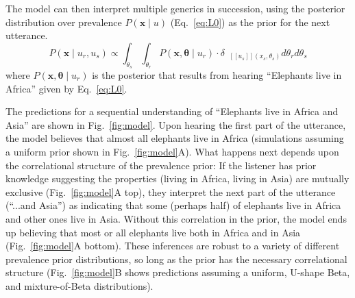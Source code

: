\documentclass[10pt,letterpaper]{article}
\newcommand{\denote}[1]{\mbox{ $[\![ #1 ]\!]$}}
\begin{document}
The model can then interpret multiple generics in succession, using the posterior distribution over prevalence $P(\textbf{x} \mid u)$ (Eq.~\ref{eq:L0}) as the prior for the next utterance. 
\begin{equation}
P(\textbf{x} \mid u_{r}, u_{s}) \propto  \int_{\theta_s} \int_{\theta_r}P(\textbf{x}, \boldsymbol{\theta} \mid u_{r})  \cdot \delta_{\denote{u_{s}}(x_{s}, \theta_{s})} d\theta_r d\theta_s%
\label{eq:L0a}
\end{equation}
\noindent where $P(\textbf{x}, \boldsymbol{\theta} \mid u_{r})$  is the posterior that results from hearing ``Elephants live in Africa'' given by Eq.~\ref{eq:L0}.

The predictions for a sequential understanding of ``Elephants live in Africa and Asia'' are shown in Fig.~\ref{fig:model}.
Upon hearing the first part of the utterance, the model believes that almost all elephants live in Africa (simulations assuming a uniform prior shown in Fig.~\ref{fig:model}A). 
What happens next depends upon the correlational structure of the prevalence prior: If the listener has prior knowledge suggesting the properties (living in Africa, living in Asia) are mutually exclusive (Fig.~\ref{fig:model}A top), they interpret the next part of the utterance (``...and Asia'') as indicating that some (perhaps half) of elephants live in Africa and other ones live in Asia. 
Without this correlation in the prior, the model ends up believing that most or all elephants live both in Africa and in Asia  (Fig.~\ref{fig:model}A bottom).
These inferences are robust to a variety of different prevalence prior distributions, so long as the prior has the necessary correlational structure (Fig.~\ref{fig:model}B shows predictions assuming a uniform, U-shape Beta, and mixture-of-Beta distributions).

\end{document}

